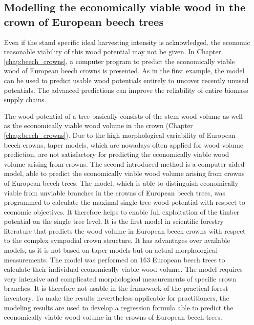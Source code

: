 \subsection{Modelling the economically viable wood in the crown of European beech trees}
\label{subsec:intro:struct:beech_crowns}
Even if the stand specific ideal harvesting intensity is acknowledged, the economic reasonable viability of this wood potential may not be given. In Chapter \ref{chap:beech_crowns}, a computer program to predict the economically viable wood of European beech crowns is presented. As in the first example, the model can be used to predict usable wood potentials entirely to uncover recently unused potentials. The advanced predictions can improve the reliability of entire biomass supply chains.

The wood potential of a tree basically consists of the stem wood volume as well as the economically viable wood volume in the crown (Chapter \ref{chap:beech_crowns}). Due to the high morphological variability of European beech crowns, taper models, which are nowadays often applied for wood volume prediction, are not satisfactory for predicting the economically viable wood volume arising from crowns. The second introduced method is a computer aided model, able to predict the economically viable wood volume arising from crowns of European beech trees. The model, which is able to distinguish economically viable from unviable branches in the crowns of European beech trees, was programmed to calculate the maximal single-tree wood potential with respect to economic objectives. It therefore helps to enable full exploitation of the timber potential on the single tree level. It is the first model in scientific forestry literature that predicts the wood volume in European beech crowns with respect to the complex sympodial crown structure. It has advantages over available models, as it is not based on taper models but on actual morphological measurements. The model was performed on 163 European beech trees to calculate their individual economically viable wood volume. The model requires very intensive and complicated morphological measurements of specific crown branches. It is therefore not usable in the framework of the practical forest inventory. To make the results nevertheless applicable for practitioners, the modeling results are used to develop a regression formula able to predict the economically viable wood volume in the crowns of European beech trees. 

